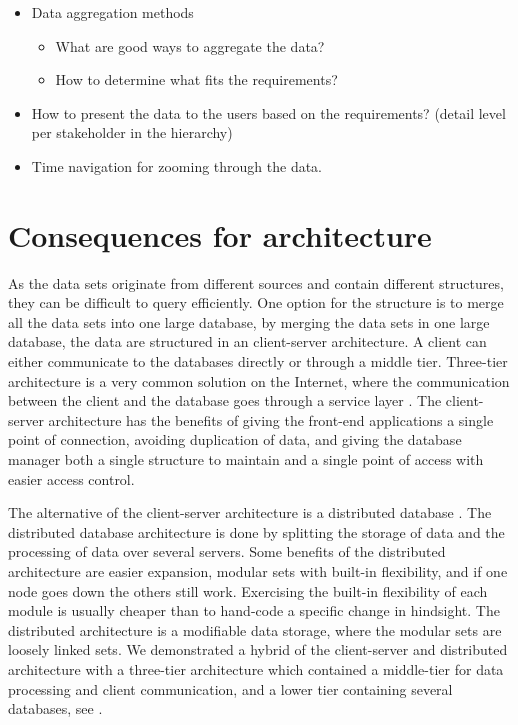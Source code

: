 \begin{itemize}
\begin{itemize}
\begin{itemize}
		\end{itemize}
	\end{itemize}
	\item Data aggregation methods
	\begin{itemize}
		\item What are good ways to aggregate the data?
		\item How to determine what fits the requirements?
	\end{itemize}
	\item How to present the data to the users based on the requirements? (detail
	level per stakeholder in the hierarchy)
	\item Time navigation for zooming through the data.
\end{itemize}



\section{Consequences for architecture} %
\label{sec:consequences_for_architecture}
As the data sets originate from different sources and contain different
structures, they can be difficult to query efficiently. One option for the structure is to merge all the
data sets into one large database, by merging the data sets in one large
database, the data are structured in an client-server architecture. 
A client can either communicate to the databases directly or through a middle
tier. Three-tier architecture is a very common solution on the Internet, where 
the communication between the client and the database goes through a service 
layer \cite[pp. 294-297]{toftHanseMallaugDatabaser}. The client-server 
architecture has the benefits of giving the front-end applications a single 
point of connection, avoiding duplication of data, and giving the database 
manager both a single structure to maintain and a single point of access with 
easier access control.

The alternative of the client-server architecture is a distributed
database \cite[pp. 301-303]{toftHanseMallaugDatabaser}. The distributed database
architecture is done by splitting the storage of data and the processing of
data over several servers. Some benefits of the distributed architecture are 
easier expansion, modular sets with built-in flexibility, and if one node 
goes down the others still work. Exercising the built-in flexibility of each
module is usually cheaper than to hand-code a specific change in hindsight\cite[pp. 117-130]{Bass:2012:SAP:2392670}. The distributed architecture is a 
modifiable data storage, where the modular sets are loosely linked sets. 
We demonstrated a hybrid of the client-server and distributed
architecture \cite[pp. 297-299]{toftHanseMallaugDatabaser} with a three-tier
architecture which contained a middle-tier for data processing and client
communication, and a lower tier containing several databases, see
.

